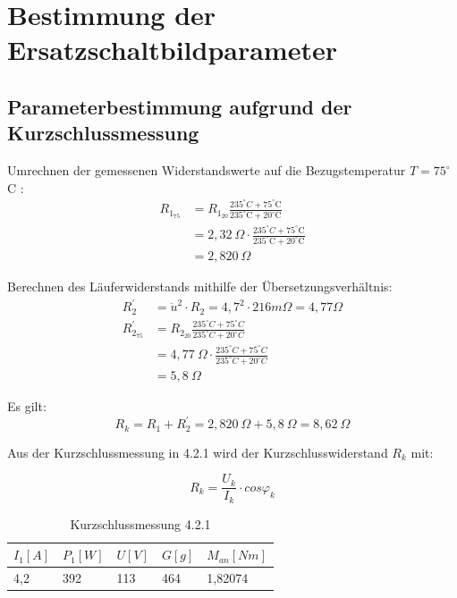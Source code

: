 \documentclass[conference]{IEEEtran}
\begin{document}
\section{Bestimmung der Ersatzschaltbildparameter}
\subsection{Parameterbestimmung aufgrund der Kurzschlussmessung}

Umrechnen der gemessenen Widerstandswerte auf die Bezugstemperatur $T=75^\circ$C :
\begin{align*}
    R_{1_{75}} & = R_{1_{20}}\frac{235^\circ\si{C}+75^\circ\text{C}}{235^\circ\text{C}+20^\circ\text{C}}         \\
               & = 2,32\ \Omega\cdot \frac{235^\circ\si{C}+75^\circ\text{C}}{235^\circ\text{C}+20^\circ\text{C}} \\
               & = 2,820\ \Omega
\end{align*}

Berechnen des Läuferwiderstands mithilfe der Übersetzungsverhältnis:
\begin{align*}
    R_2^\prime        & = \ddot{u}^2\cdot R_2 = 4,7^2 \cdot 216\si{m\Omega}   = 4,77 \Omega                             \\
    R_{2_{75}}^\prime & = R_{2_{20}}\frac{235^\circ\si{C}+75^\circ\si{C}}{235^\circ\si{C}+20^\circ\si{C}}         \\
                      & = 4,77\ \Omega\cdot \frac{235^\circ\si{C}+75^\circ\si{C}}{235^\circ\si{C}+20^\circ\si{C}} \\
                      & = 5,8\ \Omega
\end{align*}

Es gilt:
\begin{equation} \label{eq:Kurzschlusswiderstand_gemessen}
    \boxed{R_k = R_1 + R_2^\prime = 2,820\ \Omega + 5,8\ \Omega = 8,62\ \Omega}
\end{equation}

Aus der Kurzschlussmessung in 4.2.1 wird der Kurzschlusswiderstand $R_k$ mit:

\begin{equation} \label{eq:Kurzschlusswiderstand}
    \boxed{R_k = \frac{U_k}{I_k}\cdot cos\varphi_k}
\end{equation}

\begin{table}[htbp]
    \begin{tabularx}{\columnwidth}{XXXXX}
        \toprule
        $I_1[A]$ & $P_1[W]$ & $U[V]$ & $G[g]$ & $M_{an}[Nm]$ \\
        \midrule
        4,2      & 392      & 113    & 464    & 1,82074      \\
        \bottomrule
    \end{tabularx}
    \caption{Kurzschlussmessung 4.2.1}
    \label{tab:Kurzschlussmessung}
\end{table}
\end{document}
